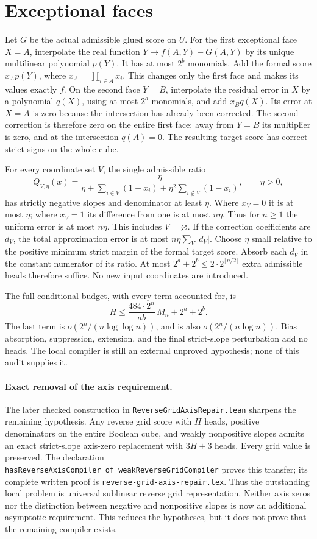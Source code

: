 \documentclass[11pt]{article}
\begin{document}
\section{Exceptional faces}
Let $G$ be the actual admissible glued score on $U$. For the first
exceptional face $X=A$, interpolate the real function
$Y\mapsto f(A,Y)-G(A,Y)$ by its unique multilinear polynomial $p(Y)$.
It has at most $2^b$ monomials. Add the formal score
$x_Ap(Y)$, where $x_A=\prod_{i\in A}x_i$. This changes only the first
face and makes its values exactly $f$. On the second face $Y=B$,
interpolate the residual error in $X$ by a polynomial $q(X)$, using
at most $2^a$ monomials, and add $x_Bq(X)$. Its error at $X=A$ is
zero because the intersection has already been corrected. The second
correction is therefore zero on the entire first face: away from
$Y=B$ its multiplier is zero, and at the intersection $q(A)=0$.
The resulting target score has correct strict signs on the whole cube.

For every coordinate set $V$, the single admissible ratio
\[
Q_{V,\eta}(x)=\frac{\eta}{\eta+\sum_{i\in V}(1-x_i)
+\eta^2\sum_{i\notin V}(1-x_i)},\qquad\eta>0,
\]
has strictly negative slopes and denominator at least $\eta$.
Where $x_V=0$ it is at most $\eta$; where $x_V=1$ its difference
from one is at most $n\eta$. Thus for $n\geq1$ the uniform error
is at most $n\eta$. This includes $V=\varnothing$.
If the correction coefficients are $d_V$, the total approximation
error is at most $n\eta\sum_V|d_V|$. Choose $\eta$ small relative
to the positive minimum strict margin of the formal target score.
Absorb each $d_V$ in the constant numerator of its ratio. At most
$2^a+2^b\leq2\cdot2^{\lceil n/2\rceil}$ extra admissible heads
therefore suffice. No new input coordinates are introduced.

The full conditional budget, with every term accounted for, is
\[
H\leq\frac{484\cdot2^n}{ab}\,M_n+2^a+2^b.
\]
The last term is $o(2^n/(n\log\log n))$, and is also
$o(2^n/(n\log n))$. Bias absorption, suppression, extension, and the
final strict-slope perturbation add no heads. The local compiler is
still an external unproved hypothesis; none of this audit supplies it.
\paragraph{Exact removal of the axis requirement.}
The later checked construction in \texttt{ReverseGridAxisRepair.lean}
sharpens the remaining hypothesis. Any reverse grid score with $H$ heads,
positive denominators on the entire Boolean cube, and weakly nonpositive
slopes admits an exact strict-slope axis-zero replacement with $3H+3$
heads. Every grid value is preserved. The declaration
\texttt{hasReverseAxisCompiler\_of\_weakReverseGridCompiler} proves this
transfer; its complete written proof is
\texttt{reverse-grid-axis-repair.tex}. Thus the outstanding local problem
is universal sublinear reverse grid representation. Neither axis zeros
nor the distinction between negative and nonpositive slopes is now an
additional asymptotic requirement. This reduces the hypotheses, but it
does not prove that the remaining compiler exists.
\end{document}
